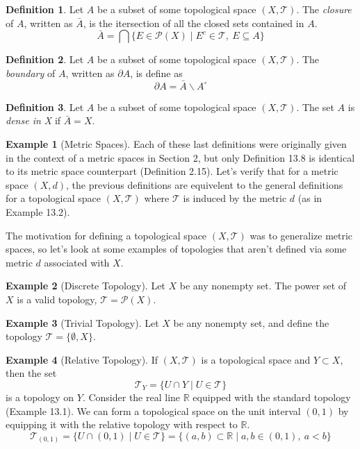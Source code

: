 \documentclass{article}
\newcommand{\R}{\mathbb{R}}
\newcommand{\T}{\mathcal{T}}
\theoremstyle{definition}
\newtheorem{definition}{Definition}[section]
\newtheorem{example}{Example}[section]
\begin{document}
	\begin{definition}\label{def13.6}
		Let $A$ be a subset of some topological space $(X,\T)$. The  \textit{\color{red}closure} of $A$, written as  $\bar A$, is the itersection of all the closed sets contained in $A$.
		$$\bar A = \bigcap\{E\in\mathcal{P}(X)\mid E^c\in\T,\ E\subseteq A \}$$
	\end{definition}
	
	\begin{definition}\label{def13.7}
		Let $A$ be a subset of some topological space $(X,\T)$. The  \textit{\color{red}boundary} of $A$, written as  $\partial A$, is define as 
		$$ \partial A = \bar A \backslash A^\circ$$
	\end{definition}
	
	\begin{definition}\label{def13.8}
		Let $A$ be a subset of some topological space $(X,\T)$.  The set $A$ is \textit{\color{red}dense in X} if $\bar A = X$.
	\end{definition}
	
	
	\begin{example}[Metric Spaces]
		Each of these last definitions were originally given in the context of a metric spaces in Section 2, but only Definition 13.8 is identical to its metric space counterpart (Definition 2.15). Let's verify that for a metric space $(X,d)$, the previous definitions are equivelent to the general definitions for a topological space $(X, \mathcal T)$ where $\mathcal T$ is induced by the metric $d$ (as in Example 13.2). 
	\end{example}


	
	The motivation for defining a topological space $(X,\T)$ was to generalize metric spaces, so let's look at some examples of topologies that aren't defined via some metric $d$ associated with $X$. 
	
	
	\begin{example}[Discrete Topology]
		Let $X$ be any nonempty set. The power set of $X$ is a valid topology, $\mathcal T = \mathcal P(X)$. 
	\end{example}
	\begin{example}[Trivial Topology]
		Let $X$ be any nonempty set, and define the topology $\mathcal T = \{\emptyset, X\}$.
	\end{example}
	\begin{example}[Relative Topology]
		If $(X,\T)$ is a topological space and $Y\subset X$, then the set $$\T_Y=\{U\cap Y\mid U\in \T\}$$ is a topology on $Y$. Consider the real line $\R$ equipped with the standard topology (Example 13.1). We can form a topological space on the unit interval $(0,1)$ by equipping it with the relative topology with respect to $\R$. $$\T_{(0,1)}=\{U\cap (0,1)\mid U\in \T\} = \{(a,b)\subset \R \mid a,b\in(0,1),\ a<b\}$$
	\end{example}
\end{document}
